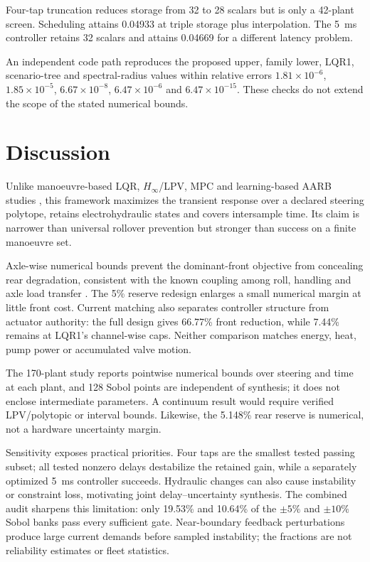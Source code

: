 \documentclass[fleqn,final,5p,times]{elsarticle}
\begin{document}
{Four-tap truncation reduces storage from 32 to 28 scalars but is only a 42-plant screen. Scheduling attains 0.04933 at triple storage plus interpolation. The \SI{5}{ms} controller retains 32 scalars and attains 0.04669 for a different latency problem.}

An independent code path reproduces the proposed upper, family lower, LQR1, scenario-tree and spectral-radius values within relative errors $1.81\times10^{-6}$, $1.85\times10^{-5}$, $6.67\times10^{-8}$, $6.47\times10^{-6}$ and $6.47\times10^{-15}$. These checks do not extend the scope of the stated numerical bounds.

\section{Discussion}
\label{sec:discussion}

Unlike manoeuvre-based LQR, $H_\infty$/LPV, MPC and learning-based AARB studies \cite{vu2017,vu2019lpv,vu2019leakage,oliveira2025,sonnino2026,huang2026}, this framework maximizes the transient response over a declared steering polytope, retains electrohydraulic states and covers intersample time. Its claim is narrower than universal rollover prevention but stronger than success on a finite manoeuvre set.

Axle-wise numerical bounds prevent the dominant-front objective from concealing rear degradation, consistent with the known coupling among roll, handling and axle load transfer \cite{sampson2003achievable,sampson2003active}. The 5\% reserve redesign enlarges a small numerical margin at little front cost. Current matching also separates controller structure from actuator authority: the full design gives 66.77\% front reduction, while 7.44\% remains at LQR1's channel-wise caps. Neither comparison matches energy, heat, pump power or accumulated valve motion.

The 170-plant study reports pointwise numerical bounds over steering and time at each plant, and 128 Sobol points are independent of synthesis; it does not enclose intermediate parameters. A continuum result would require verified LPV/polytopic or interval bounds. Likewise, the 5.148\% rear reserve is numerical, not a hardware uncertainty margin.

Sensitivity exposes practical priorities. Four taps are the smallest tested passing subset; all tested nonzero delays destabilize the retained gain, while a separately optimized \SI{5}{ms} controller succeeds. Hydraulic changes can also cause instability or constraint loss, motivating joint delay--uncertainty synthesis. The combined audit sharpens this limitation: only 19.53\% and 10.64\% of the $\pm5\%$ and $\pm10\%$ Sobol banks pass every sufficient gate. Near-boundary feedback perturbations produce large current demands before sampled instability; the fractions are not reliability estimates or fleet statistics.
\end{document}
